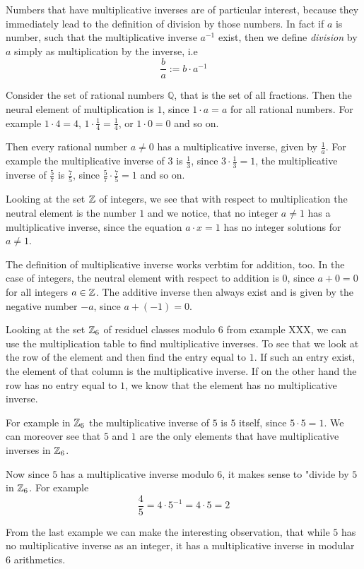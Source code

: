 Numbers that have multiplicative inverses are of particular interest, because they immediately lead to the definition of division by those numbers. In fact if $a$ is number, such that the multiplicative inverse $a^{-1}$ exist, then we define \textit{division} by $a$ simply as multiplication by the inverse, i.e
\begin{equation}
\frac{b}{a}:= b\cdot a^{-1}
\end{equation}
\begin{example} Consider the set of rational numbers $\mathbb{Q}$, that is the set of all fractions. Then the neural element of multiplication is $1$, since $1\cdot a = a$ for all rational numbers. For example $1\cdot 4=4$, $1\cdot \frac{1}{4}=\frac{1}{4}$, or $1\cdot 0 =0$ and so on.

Then every rational number $a\neq 0$ has a multiplicative inverse, given by $\frac{1}{a}$. 
For example the multiplicative inverse of $3$ is $\frac{1}{3}$, since $3\cdot \frac{1}{3}=1$, the multiplicative inverse of $\frac{5}{7}$ is $\frac{7}{5}$, since $\frac{5}{7}\cdot \frac{7}{5}=1$ and so on. 
\end{example}
\begin{example}Looking at  the set $\mathbb{Z}$ of integers, we see that with respect to multiplication the neutral element is the number $1$ and we notice, that no integer $a\neq 1$ has a multiplicative inverse, since the equation $a\cdot x =1$ has no integer solutions for $a\neq 1$. 

The definition of multiplicative inverse works verbtim for addition, too. In the case of integers, the neutral element with respect to addition is $0$, since $a+0=0$ for all integers $a\in\mathbb{Z}$. The additive inverse then always exist and is given by the negative number $-a$, since $a+(-1)=0$.  
\end{example}
\begin{example} Looking at the set $\mathbb{Z}_6$ of residuel classes modulo $6$ from example XXX, we can use the multiplication table to find multiplicative inverses. To see that we look at the row of the element and then find the entry equal to $1$. If such an entry exist, the element of that column is the multiplicative inverse. If on the other hand the row has no entry equal to $1$, we know that the element has no multiplicative inverse.

For example in $\mathbb{Z}_6$ the multiplicative inverse of $5$ is $5$ itself, since $5\cdot 5=1$. We can moreover see that $5$ and $1$ are the only elements that have multiplicative inverses in $\mathbb{Z}_6$. 

Now since $5$ has a multiplicative inverse modulo $6$, it makes sense to "divide by $5$ in $\mathbb{Z}_6$. For example
$$
\frac{4}{5}= 4\cdot 5^{-1} = 4\cdot 5 = 2
$$ 
\end{example}
From the last example we can make the interesting observation, that while $5$ has no multiplicative inverse as an integer, it has a multiplicative inverse in modular $6$ arithmetics. 

